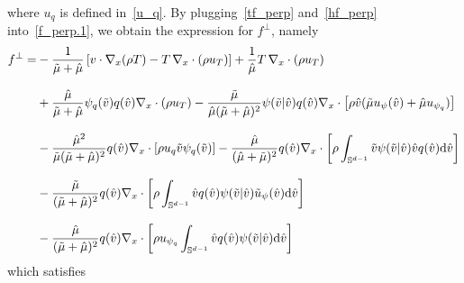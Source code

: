 \documentclass[a4paper]{article}
\theoremstyle{Theorem}\newtheorem{proposition}{Proposition}[section]
\theoremstyle{Remark}\newtheorem{remark}{Remark}[section]
\theoremstyle{Theorem}\newtheorem{theorem}{Theorem}[section]
\newcommand{\hv}{\hat{v}}
\newcommand{\tv}{\tilde{v}}
\newcommand{\hmu}{\hat{\mu}}
\newcommand{\tmu}{\tilde{\mu}}
\newcommand{\intS}{\int_{\mathbb{S}^{d-1}}}
\begin{document}
where $u_q$ is defined in~\eqref{u_q}. By plugging~\eqref{tf_perp} and~\eqref{hf_perp} into~\eqref{f_perp.1}, we obtain the expression for $f^{\bot}$, namely
\begin{equation}\label{f_perp.2}
\begin{split}
    f^{\bot} =& -\dfrac{1}{\tmu+\hmu} \left[v\cdot \nabla_x (\rho T)-T\,\nabla_x \cdot (\rho u_T) \right] +\dfrac{1}{\hmu}T\,\nabla_x\cdot(\rho u_T)\\[0.3cm]
    &+\dfrac{\hmu}{\tmu+\hmu}\psi_q(\tv)q(\hv)\nabla_x\cdot(\rho u_T)-\dfrac{\tmu}{\hmu(\tmu+\hmu)^2}\psi(\tv|\hv)q(\hv)\nabla_x\cdot\left[\rho\hv(\tmu u_\psi(\hv)+\hmu u_{\psi_q})\right] \\[0.3cm]
    &-\dfrac{\hmu^2}{\tmu(\tmu+\hmu)^2}q(\hv)\nabla_x\cdot\left[\rho u_q\tv\psi_q(\tv)\right]-\dfrac{\hmu}{(\hmu+\tmu)^2}q(\hv)\nabla_x\cdot\left[\rho\intS\tv\psi(\tv|\hv)\hv q(\hv){\rm d}\hv\right]\\[0.3cm]
    &-\dfrac{\tmu}{(\tmu+\hmu)^2}q(\hv)\nabla_x\cdot\left[\rho\intS\hv q(\hv)\psi(\tv|\hv)\tilde{u}_{\psi}(\hv){\rm d}\hv\right]\\[0.3cm]
    &-\dfrac{\hmu}{(\tmu+\hmu)^2}q(\hv)\nabla_x\cdot\left[\rho u_{\psi_q}\intS\hv q(\hv)\psi(\tv|\hv){\rm d}\hv\right]\,
    \end{split}
\end{equation}
which satisfies 
\end{document}
